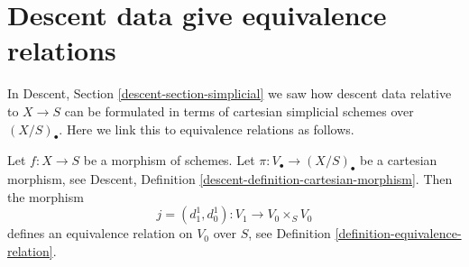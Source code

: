 












\section{Descent data give equivalence relations}
\label{section-equivalence-relation}

\noindent
In Descent, Section \ref{descent-section-simplicial} we saw how descent
data relative to $X \to S$ can be formulated in terms of cartesian simplicial
schemes over $(X/S)_\bullet$. Here we link this to equivalence
relations as follows.

\begin{lemma}
\label{lemma-equivalence-relation}
Let $f : X \to S$ be a morphism of schemes.
Let $\pi : V_\bullet \to (X/S)_\bullet$ be a cartesian morphism,
see Descent, Definition \ref{descent-definition-cartesian-morphism}.
Then the morphism
$$
j = (d^1_1, d^1_0) : V_1 \to V_0 \times_S V_0
$$
defines an equivalence relation on $V_0$ over $S$,
see Definition \ref{definition-equivalence-relation}.
\end{lemma}


